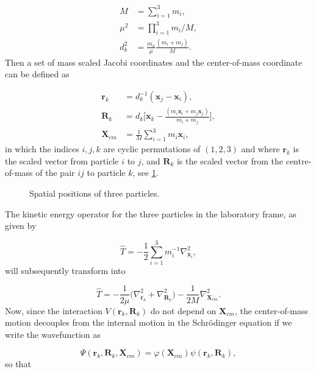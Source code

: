\documentclass{article}
\numberwithin{equation}{section}
\numberwithin{figure}{section}
\begin{document}
\begin{align}
M &= \sum_{i=1}^{3}m_i,  \label{eq:3,1} \\
\mu^2 &= \prod_{i=1}^{3}m_i/M,  \label{eq:3,2}\\
d_k^2 &= \frac{m_k}{\mu}\frac{(m_i+m_j)}{M}.  \label{eq:3,3}
\end{align}
Then a set of mass scaled Jacobi coordinates and the center-of-mass coordinate can be defined as

\begin{align}
\mathbf{r}_k &= d^{-1}_k(\mathbf{x}_{j}-\mathbf{x}_{i}),  \label{eq:4,1} \\
\mathbf{R}_k &= d_k\Big[\mathbf{x}_{k}-\frac{(m_{i}\mathbf{x}_{i}+m_{j}\mathbf{x}_{j})}{m_{i}+m_{j}}\Big],  \label{eq:4,2}\\
\mathbf{X}_{cm} &= \frac{1}{M} \sum_{i=1}^{3} m_{i} \mathbf{x}_{i},  \label{eq:4,3}
\end{align}   
 in which the indices $i,j,k$ are cyclic permutations of $(1,2,3)$ and where $\mathbf{r}_k$ is the scaled vector from particle $i$ to $j$, and $\mathbf{R}_k$ is the scaled vector from the centre-of-mass of the pair $ij$ to particle $k$, see \cref{fig:1}.
 \begin{figure}
 	\centering
 	
 	\caption{Spatial positions of three particles.}
 	\label{fig:1}
 \end{figure}
 The kinetic energy operator for the three particles in the laboratory frame, as given by 

\begin{equation}\label{eq:5}
\hat{T} = -\frac{1}{2} \sum_{i=1}^{3} m_{i}^{-1} \nabla^{2}_{\mathbf{x}_{i}}, 
\end{equation}
will subsequently transform into

\begin{equation}\label{eq:6}
\hat{T} = -\frac{1}{2\mu} \Big(\nabla^{2}_{\mathbf{r}_{k}}+\nabla^{2}_{\mathbf{R}_{k}}\Big) - \frac{1}{2 M}\nabla^{2}_{\mathbf{X}_{cm}}. 
\end{equation}
Now, since the interaction $V(\mathbf{r}_k,\mathbf{R}_k)$ do not depend on $\mathbf{X}_{cm}$, the center-of-mass motion decouples from the internal motion in the Schr{\"o}dinger equation if we write the wavefunction as

\begin{equation}
\Psi(\mathbf{r}_k,\mathbf{R}_k,\mathbf{X}_{cm}) = \varphi(\mathbf{X}_{cm})\psi(\mathbf{r}_k,\mathbf{R}_k),
\end{equation}
so that
\end{document}
